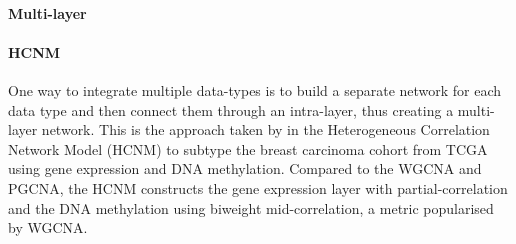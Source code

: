 
\paragraph*{Multi-layer} \label{s:lit:multi-layer}

\paragraph*{HCNM} \label{s:lit:HCNM}

One way to integrate multiple data-types is to build a separate network for each data type and then connect them through an intra-layer, thus creating a multi-layer network. This is the approach taken by \citet{Vangimalla2021-fc} in the Heterogeneous Correlation Network Model (HCNM) to subtype the breast carcinoma cohort from TCGA using gene expression and DNA methylation. Compared to the WGCNA and PGCNA, the HCNM constructs the gene expression layer with partial-correlation and the DNA methylation using biweight mid-correlation, a metric popularised by WGCNA. 

